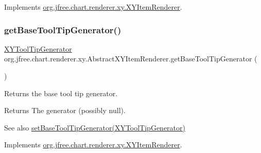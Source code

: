 Implements \mbox{\hyperlink{interfaceorg_1_1jfree_1_1chart_1_1renderer_1_1xy_1_1_x_y_item_renderer_a8f57b67c1de4f5a63fc6f55dba4be0f6}{org.\+jfree.\+chart.\+renderer.\+xy.\+X\+Y\+Item\+Renderer}}.

\mbox{\label{classorg_1_1jfree_1_1chart_1_1renderer_1_1xy_1_1_abstract_x_y_item_renderer_a9c3702b29c250e9f75066e367c65cd5a}} 
\subsubsection{\texorpdfstring{get\+Base\+Tool\+Tip\+Generator()}{getBaseToolTipGenerator()}}
{\footnotesize\ttfamily \mbox{\hyperlink{interfaceorg_1_1jfree_1_1chart_1_1labels_1_1_x_y_tool_tip_generator}{X\+Y\+Tool\+Tip\+Generator}} org.\+jfree.\+chart.\+renderer.\+xy.\+Abstract\+X\+Y\+Item\+Renderer.\+get\+Base\+Tool\+Tip\+Generator (\begin{DoxyParamCaption}{ }\end{DoxyParamCaption})}

Returns the base tool tip generator.

\begin{DoxyReturn}{Returns}
The generator (possibly {\ttfamily null}).
\end{DoxyReturn}
\begin{DoxySeeAlso}{See also}
\mbox{\hyperlink{classorg_1_1jfree_1_1chart_1_1renderer_1_1xy_1_1_abstract_x_y_item_renderer_aff6e3670d0799d590158695fe311a337}{set\+Base\+Tool\+Tip\+Generator(\+X\+Y\+Tool\+Tip\+Generator)}} 
\end{DoxySeeAlso}


Implements \mbox{\hyperlink{interfaceorg_1_1jfree_1_1chart_1_1renderer_1_1xy_1_1_x_y_item_renderer_ad56671cc8a9a90acdf7eae3339a0d068}{org.\+jfree.\+chart.\+renderer.\+xy.\+X\+Y\+Item\+Renderer}}.

\mbox{\label{classorg_1_1jfree_1_1chart_1_1renderer_1_1xy_1_1_abstract_x_y_item_renderer_a70e45e6e4e284ae4f66faf1d2e49fa32}} 
